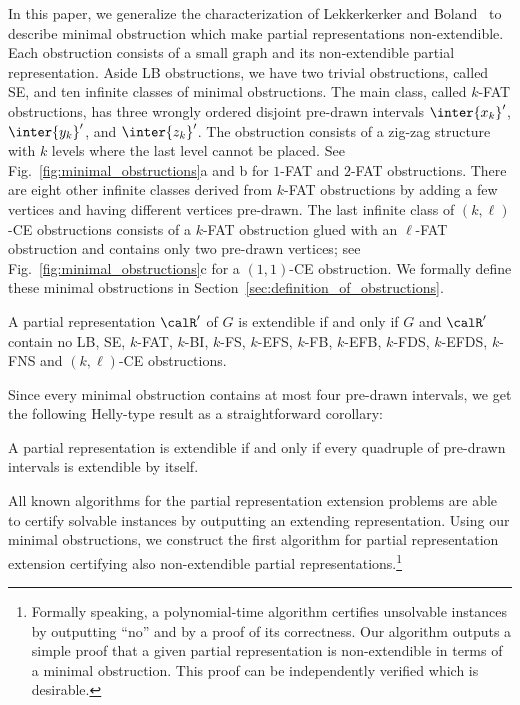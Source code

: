 In this paper, we generalize the characterization of Lekkerkerker and Boland~\cite{lb_graphs} to
describe minimal obstruction which make partial representations non-extendible.  Each obstruction
consists of a small graph and its non-extendible partial representation.  Aside LB obstructions, we have
two trivial obstructions, called SE, and ten infinite classes of minimal obstructions. The main
class, called $k$-FAT obstructions, has three wrongly ordered disjoint pre-drawn intervals
$\inter{x_k}'$, $\inter{y_k}'$, and $\inter{z_k}'$. The obstruction consists of a zig-zag structure
with $k$ levels where the last level cannot be placed.  See Fig.~\ref{fig:minimal_obstructions}a and
b for $1$-FAT and $2$-FAT obstructions. There are eight other infinite classes derived from $k$-FAT
obstructions by adding a few vertices and having different vertices pre-drawn. The last infinite
class of $(k,\ell)$-CE obstructions consists of a $k$-FAT obstruction glued with an $\ell$-FAT
obstruction and contains only two pre-drawn vertices; see Fig.~\ref{fig:minimal_obstructions}c for a
$(1,1)$-CE obstruction.  We formally define these minimal obstructions in
Section~\ref{sec:definition_of_obstructions}.

\begin{theorem} \label{thm:repext_obstructions}
A partial representation $\calR'$ of $G$ is extendible if and only if $G$ and $\calR'$ contain no
LB, SE, $k$-FAT, $k$-BI, $k$-FS, $k$-EFS, $k$-FB, $k$-EFB, $k$-FDS, $k$-EFDS, $k$-FNS and
$(k,\ell)$-CE obstructions.
\end{theorem}

Since every minimal obstruction contains at most four pre-drawn intervals, we get the following
Helly-type result as a straightforward corollary:

\begin{corollary} \label{cor:helly_obstructions}
A partial representation is extendible if and only if every quadruple of pre-drawn intervals is
extendible by itself.
\end{corollary}

All known algorithms for the partial representation extension problems
\cite{kkv,kkkw,blas_rutter,kkosv,kkorssv,kkos} are able to certify solvable instances by outputting
an extending representation. Using our minimal obstructions, we construct the first algorithm for
partial representation extension certifying also non-extendible partial
representations.\footnote{Formally speaking, a polynomial-time algorithm certifies
unsolvable instances by outputting ``no'' and by a proof of its correctness. Our algorithm
outputs a simple proof that a given partial representation is non-extendible in terms of a
minimal obstruction. This proof can be independently verified which is desirable.}

